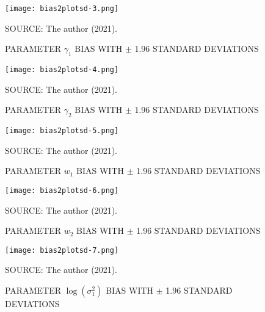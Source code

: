 \begin{figure}[H]
 \setlength{\abovecaptionskip}{.0001pt}
 \caption{PARAMETER \(\gamma_{1}\) BIAS WITH \(\pm\) 1.96 STANDARD
          DEVIATIONS}
 \vspace{0.2cm}\centering
 \texttt{[image: bias2plotsd-3.png]}\\
 \begin{footnotesize}
  SOURCE: The author (2021).
 \end{footnotesize}
 \label{fig:biassdgama1}
\end{figure}

\begin{figure}[H]
 \setlength{\abovecaptionskip}{.0001pt}
 \caption{PARAMETER \(\gamma_{2}\) BIAS WITH \(\pm\) 1.96 STANDARD
          DEVIATIONS}
 \vspace{0.2cm}\centering
 \texttt{[image: bias2plotsd-4.png]}\\
 \begin{footnotesize}
  SOURCE: The author (2021).
 \end{footnotesize}
 \label{fig:biassdgama2}
\end{figure}

\begin{figure}[H]
 \setlength{\abovecaptionskip}{.0001pt}
 \caption{PARAMETER \(w_{1}\) BIAS WITH \(\pm\) 1.96 STANDARD DEVIATIONS}
 \vspace{0.2cm}\centering
 \texttt{[image: bias2plotsd-5.png]}\\
 \begin{footnotesize}
  SOURCE: The author (2021).
 \end{footnotesize}
 \label{fig:biassdw1}
\end{figure}

\begin{figure}[H]
 \setlength{\abovecaptionskip}{.0001pt}
 \caption{PARAMETER \(w_{2}\) BIAS WITH \(\pm\) 1.96 STANDARD DEVIATIONS}
 \vspace{0.2cm}\centering
 \texttt{[image: bias2plotsd-6.png]}\\
 \begin{footnotesize}
  SOURCE: The author (2021).
 \end{footnotesize}
 \label{fig:biassdw2}
\end{figure}

\begin{figure}[H]
 \setlength{\abovecaptionskip}{.0001pt}
 \caption{PARAMETER \(\log(\sigma_{1}^{2})\) BIAS WITH \(\pm\) 1.96
          STANDARD DEVIATIONS}
 \vspace{0.2cm}\centering
 \texttt{[image: bias2plotsd-7.png]}\\
 \begin{footnotesize}
  SOURCE: The author (2021).
 \end{footnotesize}
 \label{fig:biassdlogs2_1}
\end{figure}

